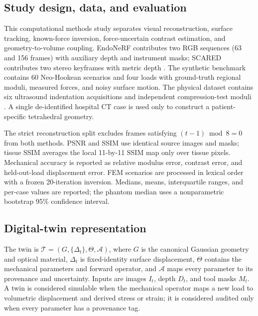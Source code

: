 \documentclass[smallextended]{svjour3}
\begin{document}
\subsection{Study design, data, and evaluation}
This computational methods study separates visual reconstruction,
surface tracking, known-force inversion, force-uncertain contrast
estimation, and geometry-to-volume coupling. EndoNeRF contributes two RGB
sequences (63 and 156 frames) with auxiliary depth and instrument masks;
SCARED contributes two stereo keyframes with metric depth
\cite{endonerf,scared}. The synthetic benchmark contains 60
Neo-Hookean scenarios and four loads with ground-truth regional moduli,
measured forces, and noisy surface motion. The physical dataset contains
six ultrasound indentation acquisitions and independent compression-test
moduli \cite{etsphantom}. A single de-identified hospital CT case is used
only to construct a patient-specific tetrahedral geometry.

The strict reconstruction split excludes frames satisfying
$(t-1)\bmod 8=0$ from both methods. PSNR and SSIM use identical source
images and masks; tissue SSIM averages the local 11-by-11 SSIM map only
over tissue pixels. Mechanical accuracy is reported as relative modulus
error, contrast error, and held-out-load displacement error. FEM scenarios
are processed in lexical order with a frozen 20-iteration inversion.
Medians, means, interquartile ranges, and per-case values are reported; the
phantom median uses a nonparametric bootstrap 95\% confidence interval.

\subsection{Digital-twin representation}
The twin is
$\mathcal{T}=(G,\{\Delta_t\},\Theta,\mathcal{A})$, where $G$ is the
canonical Gaussian geometry and optical material, $\Delta_t$ is
fixed-identity surface displacement, $\Theta$ contains the mechanical
parameters and forward operator, and $\mathcal{A}$ maps every parameter to
its provenance and uncertainty. Inputs are images $I_t$, depth $D_t$, and
tool masks $M_t$. A twin is considered simulable when the mechanical
operator maps a new load to volumetric displacement and derived stress or
strain; it is considered audited only when every parameter has a
provenance tag.
\end{document}
